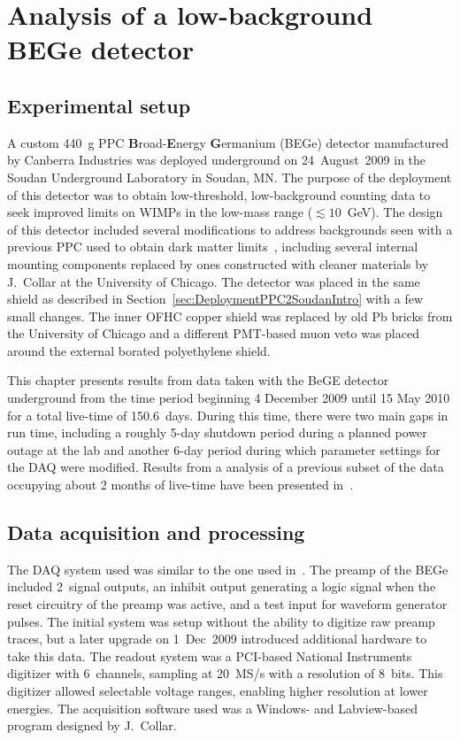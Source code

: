 \chapter{Analysis of a low-background BEGe detector}
\label{chap:AnalysisBeGe}
	\section{Experimental setup}
	\label{sec:BeGeExperimentalSetup}

A custom 440~g PPC \textbf{B}road-\textbf{E}nergy \textbf{G}ermanium (BEGe) detector manufactured by Canberra Industries was deployed underground on 24~August~2009 in the Soudan Underground Laboratory in Soudan, MN.  The purpose of the deployment of this detector was to obtain low-threshold, low-background counting data to seek improved limits on WIMPs in the low-mass range ($\lesssim10$~GeV).  The design of this detector included several modifications to address backgrounds seen with a previous PPC used to obtain dark matter limits~\cite{Aalseth:2008aa}, including several internal mounting components replaced by ones constructed with cleaner materials by J.~Collar at the University of Chicago.  
The detector was placed in the same shield as described in Section~\ref{sec:DeploymentPPC2SoudanIntro} with a few small changes.  The inner OFHC copper shield was replaced by old Pb bricks from the University of Chicago and a different PMT-based muon veto was placed around the external borated polyethylene shield.   %

This chapter presents results from data taken with the BeGE detector underground from the time period beginning 4 December 2009 until 15 May 2010 for a total live-time of 150.6~days.  During this time, there were two main gaps in run time, including a roughly 5-day shutdown period during a planned power outage at the lab and another 6-day period during which parameter settings for the DAQ were modified.  Results from a analysis of a previous subset of the data occupying about 2 months of live-time have been presented in~\cite{Aalseth:2010aa}.

	\section{Data acquisition and processing}
	\label{sec:BeGeDAQProcessing}
	
The DAQ system used was similar to the one used in~\cite{Aalseth:2008aa}.  The preamp of the BEGe included 2~signal outputs, an inhibit output generating a logic signal when the reset circuitry of the preamp was active, and a test input for waveform generator pulses.  The initial system was setup without the ability to digitize raw preamp traces, but a later upgrade on 1~Dec~2009 introduced additional hardware to take this data.  The readout system was a PCI-based National Instruments digitizer with 6~channels, sampling at 20~MS/s with a resolution of 8~bits.  This digitizer allowed selectable voltage ranges, enabling higher resolution at lower energies.  The acquisition software used was a Windows- and Labview-based program designed by J.~Collar.  

